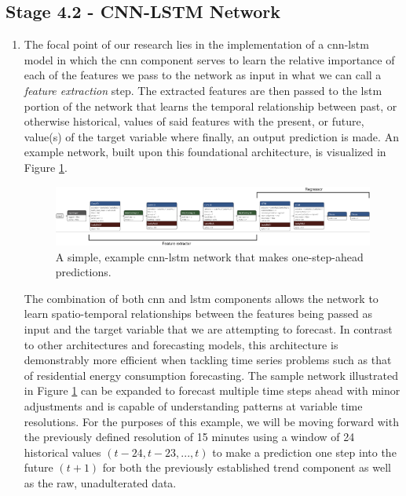 \subsection{Stage 4.2 - CNN-LSTM Network}
\label{subsec:Methodology:Stage-4:CNN-LSTM-Network}
\begin{adjustwidth}{-1.65cm}{-0.0cm}%
    \begin{enumerate}[label=Step 4.2.\arabic*:, leftmargin=*]
    \item The focal point of our research lies in the implementation of  a \gls{cnn-lstm} model in which the \gls{cnn} component serves to learn the relative importance of each of the features we pass to the network as input in what we can call a \textit{feature extraction} step. The extracted features are then passed to the \gls{lstm} portion of the network that learns the temporal relationship between past, or otherwise historical, values of said features with the present, or future, value(s) of the target variable where finally, an output prediction is made. An example network, built upon this foundational architecture, is visualized in Figure \ref{fig:UCID-CNN-LSTM-Model}.
    
    \begin{figure}[hbt!]
        \begin{adjustwidth}{-4.5cm}{-4.5cm}%
            \centering
            \includegraphics[width=\linewidth]{Images/Chapter 6/Stage 4/UCID/UCID-CNN-LSTM-Model.pdf}
            \caption{A simple, example \gls{cnn-lstm} network that makes one-step-ahead predictions.}
            \label{fig:UCID-CNN-LSTM-Model}
        \end{adjustwidth}
    \end{figure}
    
    The combination of both \gls{cnn} and \gls{lstm} components allows the network to learn spatio-temporal relationships between the features being passed as input and the target variable that we are attempting to forecast. In contrast to other architectures and forecasting models, this architecture is demonstrably more efficient \cite{Kim} when tackling time series problems such as that of residential energy consumption forecasting. The sample network illustrated in Figure \ref{fig:UCID-CNN-LSTM-Model} can be expanded to forecast multiple time steps ahead with minor adjustments and is capable of understanding patterns at variable time resolutions. For the purposes of this example, we will be moving forward with the previously defined resolution of 15 minutes using a window of 24 historical values $(t - 24, t - 23, ..., t)$ to make a prediction one step into the future $(t + 1)$ for both the previously established trend component as well as the raw, unadulterated data.
    

\end{enumerate}
\end{adjustwidth}
